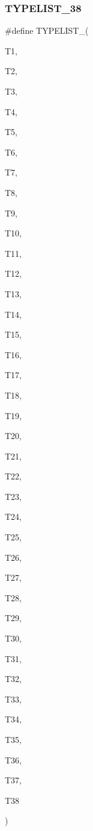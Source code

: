 \subsubsection{\texorpdfstring{TYPELIST\_38}{TYPELIST\_38}}
{\footnotesize\ttfamily \#define T\+Y\+P\+E\+L\+I\+S\+T\+\_(\begin{DoxyParamCaption}\item[{}]{T1,  }\item[{}]{T2,  }\item[{}]{T3,  }\item[{}]{T4,  }\item[{}]{T5,  }\item[{}]{T6,  }\item[{}]{T7,  }\item[{}]{T8,  }\item[{}]{T9,  }\item[{}]{T10,  }\item[{}]{T11,  }\item[{}]{T12,  }\item[{}]{T13,  }\item[{}]{T14,  }\item[{}]{T15,  }\item[{}]{T16,  }\item[{}]{T17,  }\item[{}]{T18,  }\item[{}]{T19,  }\item[{}]{T20,  }\item[{}]{T21,  }\item[{}]{T22,  }\item[{}]{T23,  }\item[{}]{T24,  }\item[{}]{T25,  }\item[{}]{T26,  }\item[{}]{T27,  }\item[{}]{T28,  }\item[{}]{T29,  }\item[{}]{T30,  }\item[{}]{T31,  }\item[{}]{T32,  }\item[{}]{T33,  }\item[{}]{T34,  }\item[{}]{T35,  }\item[{}]{T36,  }\item[{}]{T37,  }\item[{}]{T38 }\end{DoxyParamCaption})}

